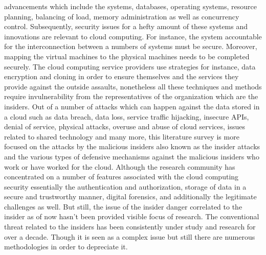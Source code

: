 advancements which include the systems, databases, operating systems, resource planning,
balancing of load, memory administration as well as concurrency control.  Subsequently,
security issues for a hefty amount of these systems and innovations are relevant to cloud
computing. For instance, the system accountable for the interconnection between a numbers
of systems must be secure. Moreover, mapping the virtual machines to the physical machines
needs to be completed securely.\cite{sen}
The cloud computing service providers use strategies for instance, data encryption and cloning
in order to ensure themselves and the services they provide against the outside assaults,
nonetheless all these techniques and methods require invulnerability from the representatives
of the organization which are the insiders.
Out of a number of attacks which can happen against the data stored in a cloud such as data
breach, data loss, service traffic hijacking, insecure APIs, denial of service, physical attacks,
overuse and abuse of cloud services, issues related to shared technology and many more, this
literature survey is more focused on the attacks by the malicious insiders also known as the
insider attacks and the various types of defensive mechanisms against the malicious insiders
who work or have worked for the cloud.
Although the research community has concentrated on a number of features associated with
the cloud computing security essentially the authentication and authorization, storage of data
in a secure and trustworthy manner, digital forensics, and additionally the legitimate challenges
as well. But still, the issue of the insider danger correlated to the insider as of now hasn’t been
provided visible focus of research.  The conventional threat related to the insiders has been
consistently under study and research for over a decade. Though it is seen as a complex issue
but still there are numerous methodologies in order to depreciate it.\cite{kandias}
